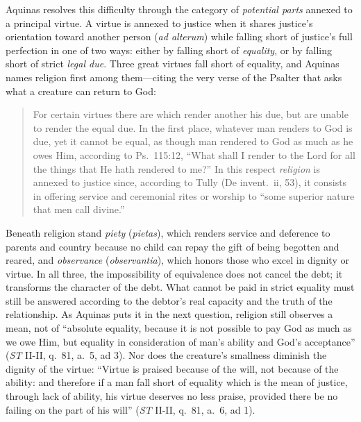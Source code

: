 Aquinas resolves this difficulty through the category of \emph{potential parts} annexed to a principal virtue. A virtue is annexed to justice when it shares justice's orientation toward another person (\emph{ad alterum}) while falling short of justice's full perfection in one of two ways: either by falling short of \emph{equality}, or by falling short of strict \emph{legal due}. Three great virtues fall short of equality, and Aquinas names religion first among them---citing the very verse of the Psalter that asks what a creature can return to God:

\begin{quote}
For certain virtues there are which render another his due, but are unable to render the equal due. In the first place, whatever man renders to God is due, yet it cannot be equal, as though man rendered to God as much as he owes Him, according to Ps.\ 115:12, ``What shall I render to the Lord for all the things that He hath rendered to me?'' In this respect \emph{religion} is annexed to justice since, according to Tully (De invent.\ ii, 53), it consists in offering service and ceremonial rites or worship to ``some superior nature that men call divine.''
\end{quote}

Beneath religion stand \emph{piety} (\emph{pietas}), which renders service and deference to parents and country because no child can repay the gift of being begotten and reared, and \emph{observance} (\emph{observantia}), which honors those who excel in dignity or virtue. In all three, the impossibility of equivalence does not cancel the debt; it transforms the character of the debt. What cannot be paid in strict equality must still be answered according to the debtor's real capacity and the truth of the relationship. As Aquinas puts it in the next question, religion still observes a mean, not of ``absolute equality, because it is not possible to pay God as much as we owe Him, but equality in consideration of man's ability and God's acceptance'' (\emph{ST} II-II, q.\ 81, a.\ 5, ad 3). Nor does the creature's smallness diminish the dignity of the virtue: ``Virtue is praised because of the will, not because of the ability: and therefore if a man fall short of equality which is the mean of justice, through lack of ability, his virtue deserves no less praise, provided there be no failing on the part of his will'' (\emph{ST} II-II, q.\ 81, a.\ 6, ad 1).

